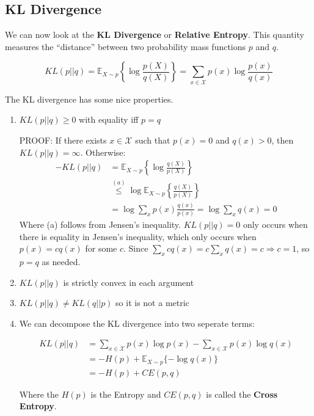 \documentclass[]{article}
\theoremstyle{mattstyle}
\theoremstyle{definition}
\begin{document}
\subsection{KL Divergence}
We can now look at the \textbf{KL Divergence} or \textbf{Relative Entropy}. This quantity measures the ``distance'' between two probability mass functions $p$ and $q$.

\begin{equation}
KL(p||q) = \mathbb{E}_{X\sim p}\left\{\log \frac{p(X)}{q(X)}\right\} = \sum_{x\in\mathcal{X}}p(x)\log\frac{p(x)}{q(x)}
\end{equation}

The KL divergence has some nice properties.
\begin{enumerate}
	\item $KL(p||q) \ge 0$ with equality iff $p=q$
	
	PROOF: If there exists $x \in \mathcal{X}$ such that $p(x) = 0$ and $q(x) > 0$, then $KL(p || q) = \infty$.	Otherwise:
	\begin{align*}
	-KL(p||q) &= \mathbb{E}_{X\sim p}\left\{\log \frac{q(X)}{p(X)}\right\}\\
	&\overset{(a)}{\le} \log \mathbb{E}_{X\sim p}\left\{\frac{q(X)}{p(X)}\right\} \\
	&= \log \sum_{x} p(x)\frac{q(x)}{p(x)} = \log \sum_{x} q(x) = 0
	\end{align*}
	Where (a) follows from Jensen's inequality. $KL(p||q) = 0$ only occurs when there is equality in Jensen's inequality, which only occurs when $p(x)=cq(x)$ for some $c$. Since $\sum_{x}cq(x) = c\sum_{x}q(x) = c \Rightarrow c=1$, so $p=q$ as needed.
	
	\item $KL(p||q)$ is strictly convex in each argument
	
	\item $KL(p||q) \ne KL(q||p)$ so it is not a metric
	
	\item We can decompose the KL divergence into two seperate terms:
	
	\begin{align} KL(p||q) &= \sum_{x\in\mathcal{X}}p(x)\log p(x) - \sum_{x\in\mathcal{X}}p(x)\log q(x) \\
	&= -H(p) + \mathbb{E}_{X\sim p}\{-\log q(x)\} \\
	&= -H(p) + CE(p,q)
	\end{align}
	
	Where the $H(p)$ is the Entropy and $CE(p,q)$ is called the \textbf{Cross Entropy}.
	
\end{enumerate}
\end{document}
